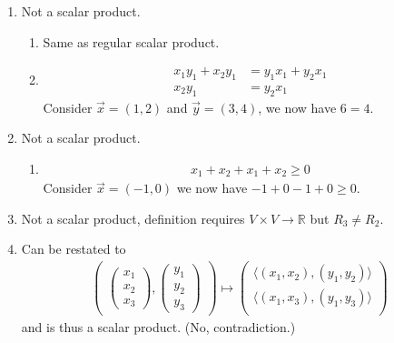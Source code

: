 \documentclass{article}
\begin{document}
\begin{enumerate}
    \item Not a scalar product.
    \begin{enumerate}[label=(\roman*)]
        \item Same as regular scalar product.
        
        \item \begin{align*}
            x_1y_1 + x_2y_1 &= y_1x_1 + y_2x_1 \\
            x_2y_1 &= y_2x_1 
        \end{align*}
        Consider $\vec{x} = (1, 2)$ and $\vec{y} = (3, 4)$, we now have $6 = 4$.
    \end{enumerate}

    \item Not a scalar product.
    \begin{enumerate}[label=(\roman*)]
        \item \begin{align*}
            x_1 + x_2 + x_1 + x_2 \geq 0
        \end{align*}
        Consider $\vec{x} = (-1, 0)$ we now have $-1 + 0 - 1 + 0 \geq 0$.
    \end{enumerate}

    \item Not a scalar product, definition requires $V \times V \rightarrow \mathbb{R}$ but $R_3 \neq R_2$.
    
    \item Can be restated to
    \begin{align*}
        \begin{pmatrix}
            \begin{pmatrix}
                x_1 \\ x_2 \\ x_3
            \end{pmatrix}, \begin{pmatrix}
                y_1 \\ y_2 \\ y_3
            \end{pmatrix}
        \end{pmatrix}
        \mapsto
        \begin{pmatrix}
            \langle (x_1,x_2),(y_1,y_2) \rangle \\
            \langle (x_1,x_3),(y_1,y_3) \rangle \\
        \end{pmatrix}
    \end{align*}
    and is thus a scalar product. (No, contradiction.)
\end{enumerate}
\end{document}
